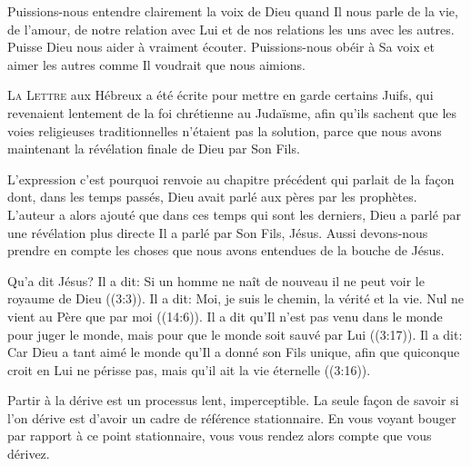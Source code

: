 Puissions-nous entendre clairement la voix de Dieu quand Il nous parle
 de la vie, de l'amour, de notre relation avec Lui et de nos relations
 les uns avec les autres. Puisse Dieu nous aider à vraiment écouter.
 Puissions-nous obéir à Sa voix et aimer les autres comme Il voudrait
 que nous aimions.

\dvrule






\lettrine{L}{a Lettre} aux Hébreux a été écrite pour mettre en garde
 certains Juifs, qui revenaient lentement de la foi chrétienne au Judaïsme,
 afin qu'ils sachent que les voies religieuses traditionnelles
 n'étaient pas la solution, parce que nous avons maintenant
 la révélation finale de Dieu par Son Fils. 

L'expression \Og c'est pourquoi \Fg{} renvoie au chapitre précédent
 qui parlait de la fa\c{c}on dont, dans les temps passés,
 Dieu avait parlé aux pères par les prophètes.
 L'auteur a alors ajouté que dans ces temps qui sont les derniers,
 Dieu a parlé par une révélation plus directe
 \ocadr Il a parlé par Son Fils, Jésus.
 Aussi devons-nous prendre en compte les choses que nous avons entendues
 de la bouche de Jésus. 


Qu'a dit Jésus? Il a dit: 
 \Og Si un homme ne naît de nouveau il ne peut voir le royaume de Dieu \Fg{}
 ((3:3)).
 Il a dit: 
 \Og Moi, je suis le chemin, la vérité et la vie.
 Nul ne vient au Père que par moi \Fg{} ((14:6)).
 Il a dit qu'Il n'est pas venu \Og dans le monde pour juger le monde,
 mais pour que le monde soit sauvé par Lui \Fg{} ((3:17)).
 Il a dit: 
 \Og Car Dieu a tant aimé le monde qu'Il a donné son Fils unique,
 afin que quiconque croit en Lui ne périsse pas,
 mais qu'il ait la vie éternelle \Fg{} ((3:16)). 

Partir à la dérive est un processus lent, imperceptible.
 La seule fa\c{c}on de savoir si l'on dérive est d'avoir un cadre de référence
 stationnaire.
 En vous voyant bouger par rapport à ce point stationnaire,
 vous vous rendez alors compte que vous dérivez. 


